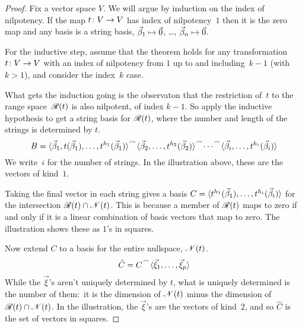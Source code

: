 \begin{proof}
Fix a vector space $V$. 
We will argue by induction on the index of nilpotency.
If the map $\mbox{$t\colon V\to V$}$
has index of nilpotency~\( 1 \) then it is the zero map and any basis 
is a string basis, $\vec{\beta}_1\mapsto\vec{0}$, \ldots, 
$\vec{\beta}_n\mapsto\vec{0}$.

For the inductive step, assume that the theorem holds for any transformation
$\mbox{$t\colon V\to V$}$
with an index of nilpotency from $1$ up to and including~\( k-1 \) (with $k>1$),
and consider the index~$k$ case.

What gets the induction going is the observaton 
that the restriction of~$t$ to the range space~\( \mathscr{R}(t) \) 
is also nilpotent, of index \( k-1 \).
So apply the inductive hypothesis to get a string basis for
\( \mathscr{R}(t) \),
where the number and length of the strings
is determined by \( t \).
\begin{equation*}
  B=\cat{\cat{\sequence{\vec{\beta}_1,t(\vec{\beta}_1),\dots,
     t^{h_1}(\vec{\beta}_1)}}{
  \cat{\sequence{\vec{\beta}_2,\ldots,t^{h_2}(\vec{\beta}_2)}}}{\cdots}}{
  \sequence{\vec{\beta}_i,\ldots,t^{h_i}(\vec{\beta}_i)} }
\end{equation*}
We write~$i$ for the number of strings.
In the illustration above, these are the vectors of kind~\( 1 \).

Taking the final vector in each string
gives a basis
\( C=\langle t^{h_1}(\vec{\beta}_1),\dots,t^{h_i}(\vec{\beta}_i)\rangle \)
for the intersection \( \mathscr{R}(t)\cap\mathscr{N}(t) \).
This is because a member of \( \mathscr{R}(t) \) maps to zero if and only
if it is a linear combination of basis vectors that map
to zero.
The illustration shows these as \( 1 \)'s in squares.

Now extend \( C \) to a basis for the entire nullspace, \( \mathscr{N}(t) \).
\begin{equation*}
  \hat{C}=\cat{C}{\sequence{\vec{\xi}_1,\dots,\vec{\xi}_p}}
\end{equation*}
While the \( \vec{\xi} \)'s aren't uniquely
determined by $t$, what is uniquely determined is the number
of them:~it is the dimension of
\( \mathscr{N}(t) \) minus the dimension of
\( \mathscr{R}(t)\cap\mathscr{N}(t) \).
In the illustration, the $\vec{\xi}$'s are the vectors of kind~\( 2 \), 
and so \( \hat{C} \) is the set of vectors in squares.


\end{proof}
